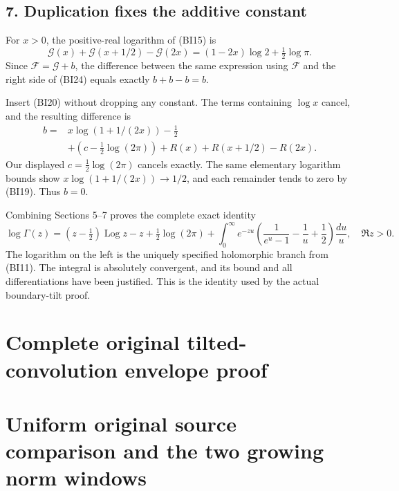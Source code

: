 \subsection{7. Duplication fixes the additive constant}\label{bt:duplication-fixes-the-additive-constant}

For \(x>0\), the positive-real logarithm of (BI15) is \[
\mathcal G(x)+\mathcal G(x+1/2)-\mathcal G(2x)
=(1-2x)\log2+\tfrac12\log\pi.
\tag{BI24}
\] Since \(\mathcal F=\mathcal G+b\), the difference between the same expression using \(\mathcal F\) and the right side of (BI24) equals exactly \(b+b-b=b\).

Insert (BI20) without dropping any constant. The terms containing \(\log x\) cancel, and the resulting difference is \[
\begin{split}
b={}&x\log(1+1/(2x))-\tfrac12\\
&+\left(c-\tfrac12\log(2\pi)\right)
 +R(x)+R(x+1/2)-R(2x).
\end{split}
\tag{BI25}
\] Our displayed \(c=\tfrac12\log(2\pi)\) cancels exactly. The same elementary logarithm bounds show \(x\log(1+1/(2x))\to1/2\), and each remainder tends to zero by (BI19). Thus \(b=0\).

Combining Sections 5--7 proves the complete exact identity \[
\boxed{
\log\Gamma(z)
=(z-\tfrac12)\operatorname{Log}z-z+\tfrac12\log(2\pi)
+\int_0^\infty e^{-zu}
\left(\frac1{e^u-1}-\frac1u+\frac12\right)\frac{du}{u},
\quad\Re z>0.}
\tag{BI26}
\] The logarithm on the left is the uniquely specified holomorphic branch from (BI11). The integral is absolutely convergent, and its bound and all differentiations have been justified. This is the identity used by the actual boundary-tilt proof.

\endgroup

\clearpage
\begingroup


\setcounter{equation}{0}
\renewcommand{\theequation}{TW.\arabic{equation}}
\section*{Complete original tilted-convolution envelope proof}
\section{Uniform original source comparison and the two growing norm windows}

